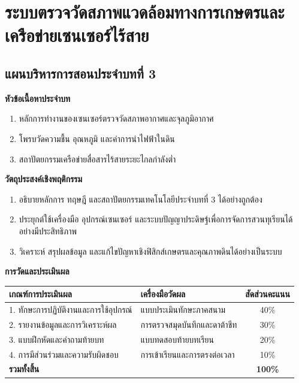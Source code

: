 \chapter{ระบบตรวจวัดสภาพแวดล้อมทางการเกษตรและเครือข่ายเซนเซอร์ไร้สาย}
\label{chap:ch03}

\section*{แผนบริหารการสอนประจำบทที่ 3}

\noindent\textbf{หัวข้อเนื้อหาประจำบท}
\begin{enumerate}
    \item หลักการทำงานของเซนเซอร์ตรวจวัดสภาพอากาศและจุลภูมิอากาศ
    \item โพรบวัดความชื้น อุณหภูมิ และค่าการนำไฟฟ้าในดิน
    \item สถาปัตยกรรมเครือข่ายสื่อสารไร้สายระยะไกลกำลังต่ำ
\end{enumerate}

\noindent\textbf{วัตถุประสงค์เชิงพฤติกรรม}
\begin{enumerate}
    \item อธิบายหลักการ ทฤษฎี และสถาปัตยกรรมเทคโนโลยีประจำบทที่ 3 ได้อย่างถูกต้อง
    \item ประยุกต์ใช้เครื่องมือ อุปกรณ์เซนเซอร์ และระบบปัญญาประดิษฐ์เพื่อการจัดการสวนทุเรียนได้อย่างมีประสิทธิภาพ
    \item วิเคราะห์ สรุปผลข้อมูล และแก้ไขปัญหาเชิงฟิสิกส์เกษตรและคุณภาพดินได้อย่างเป็นระบบ
\end{enumerate}

\noindent\textbf{การวัดและประเมินผล}
\begin{table}[H]
\centering\small
\begin{tabularx}{\textwidth}{p{} p{} c}
\toprule
\textbf{เกณฑ์การประเมินผล} & \textbf{เครื่องมือวัดผล} & \textbf{สัดส่วนคะแนน} \\
\midrule
1. ทักษะการปฏิบัติงานและการใช้อุปกรณ์ & แบบประเมินทักษะภาคสนาม & 40\% \\
2. รายงานข้อมูลและการวิเคราะห์ผล & การตรวจสมุดบันทึกและดาต้าชีท & 30\% \\
3. แบบฝึกหัดและคำถามท้ายบท & แบบทดสอบท้ายบทเรียน & 20\% \\
4. การมีส่วนร่วมและความรับผิดชอบ & การเข้าเรียนและการตรงต่อเวลา & 10\% \\
\midrule
\textbf{รวมทั้งสิ้น} & & \textbf{100\%} \\
\bottomrule
\end{tabularx}
\end{table}
\newpage

